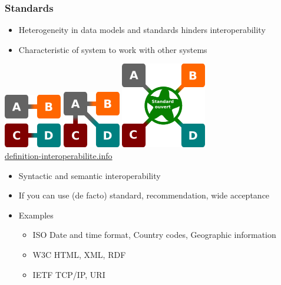 \documentclass{beamer}
\begin{document}
\begin{frame}
  \frametitle{Standards}
  
  \begin{itemize}
  \item Heterogeneity in data models and standards hinders interoperability
  \item Characteristic of system to work with other systems
  \end{itemize}
  \begin{center}
    \includegraphics[scale=0.5]{graphics/compatibility.png}\hspace{0.5cm}
    \includegraphics[scale=0.47]{graphics/de-facto-standard.png}\hspace{0.5cm}
    \includegraphics[scale=0.31]{graphics/interoperability.png}\\
    \tiny\url{definition-interoperabilite.info}
  \end{center}
  \begin{itemize}
  \item Syntactic and semantic interoperability
  \item If you can use (de facto) standard, recommendation, wide acceptance
  \item Examples
    \begin{itemize}
    \item ISO Date and time format, Country codes, Geographic information
    \item W3C HTML, XML, RDF
    \item IETF TCP/IP, URI
    \end{itemize}
  \end{itemize}
\end{frame}
\end{document}
